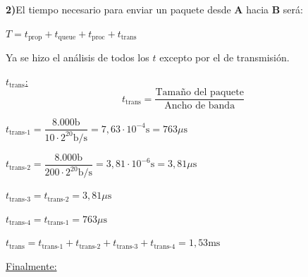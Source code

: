 \skipline
\skipline
\noindent
\textbf{2)}\tab El tiempo necesario para enviar un paquete desde \textbf{A} hacia \textbf{B} será:

\vspace{0.5\baselineskip}
\hfil
{\large
$T =
t_{\text{prop}} + t_{\text{queue}} + t_{\text{proc}} + t_{\text{trans}}$
}
\hfil

\vspace{0.5\baselineskip}
Ya se hizo el análisis de todos los $t$ excepto por el de transmisión.


\skipline
{
\noindent\large
\underline{$t_{\text{trans}}$:}
}
$$t_{\text{trans}} = \dfrac{\text{Tamaño del paquete}}{\text{Ancho de banda}}$$

\vspace{0.5\baselineskip}
$t_{\text{trans-1}} =
\dfrac{8.000\text{b}}{10 \cdot 2^{20} \text{b}/\text{s}} =
7,63\cdot 10^{-4} \text{s} =
763 \mu\text{s}
$

\vspace{0.5\baselineskip}
$t_{\text{trans-2}} =
\dfrac{8.000\text{b}}{200 \cdot 2^{20} \text{b}/\text{s}} =
3,81\cdot 10^{-6} \text{s} =
3,81 \mu\text{s}
$

\vspace{0.5\baselineskip}
$t_{\text{trans-3}} =
t_{\text{trans-2}} =
3,81 \mu\text{s}
$

\vspace{0.5\baselineskip}
$t_{\text{trans-4}} =
t_{\text{trans-1}} =
763 \mu\text{s}
$

\vspace{\baselineskip}
$t_{\text{trans}} =
t_{\text{trans-1}} + t_{\text{trans-2}} + t_{\text{trans-3}} + t_{\text{trans-4}} = 1,53 \text{ms}
$

\skipline
\noindent
\underline{Finalmente:}

\vspace{0.5\baselineskip}
\hfil
{\large
{}
}
\hfil